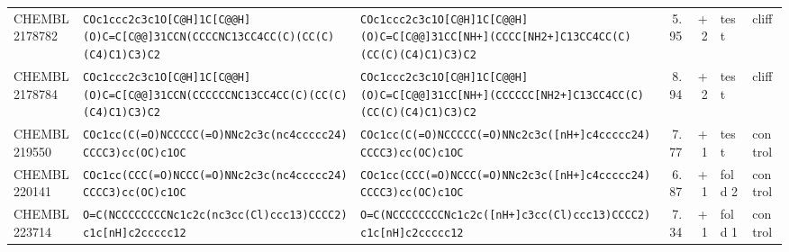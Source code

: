\begin{longtable}{l p{4.4cm} p{4.4cm} r r l l}
CHEMBL2178782 & \texttt{COc1ccc2c3c1O[C@H]\allowbreak{}1C[C@@H]\allowbreak{}(\allowbreak{}O)\allowbreak{}C=\allowbreak{}C[C@@]\allowbreak{}31CCN(\allowbreak{}CCCCNC13CC4CC(\allowbreak{}C)\allowbreak{}(\allowbreak{}CC(\allowbreak{}C)\allowbreak{}(\allowbreak{}C4)\allowbreak{}C1)\allowbreak{}C3)\allowbreak{}C2} & \texttt{COc1ccc2c3c1O[C@H]\allowbreak{}1C[C@@H]\allowbreak{}(\allowbreak{}O)\allowbreak{}C=\allowbreak{}C[C@@]\allowbreak{}31CC[NH+]\allowbreak{}(\allowbreak{}CCCC[NH2+]\allowbreak{}C13CC4CC(\allowbreak{}C)\allowbreak{}(\allowbreak{}CC(\allowbreak{}C)\allowbreak{}(\allowbreak{}C4)\allowbreak{}C1)\allowbreak{}C3)\allowbreak{}C2} & 5.95 & +2 & test & cliff \\
CHEMBL2178784 & \texttt{COc1ccc2c3c1O[C@H]\allowbreak{}1C[C@@H]\allowbreak{}(\allowbreak{}O)\allowbreak{}C=\allowbreak{}C[C@@]\allowbreak{}31CCN(\allowbreak{}CCCCCCNC13CC4CC(\allowbreak{}C)\allowbreak{}(\allowbreak{}CC(\allowbreak{}C)\allowbreak{}(\allowbreak{}C4)\allowbreak{}C1)\allowbreak{}C3)\allowbreak{}C2} & \texttt{COc1ccc2c3c1O[C@H]\allowbreak{}1C[C@@H]\allowbreak{}(\allowbreak{}O)\allowbreak{}C=\allowbreak{}C[C@@]\allowbreak{}31CC[NH+]\allowbreak{}(\allowbreak{}CCCCCC[NH2+]\allowbreak{}C13CC4CC(\allowbreak{}C)\allowbreak{}(\allowbreak{}CC(\allowbreak{}C)\allowbreak{}(\allowbreak{}C4)\allowbreak{}C1)\allowbreak{}C3)\allowbreak{}C2} & 8.94 & +2 & test & cliff \\
CHEMBL219550 & \texttt{COc1cc(\allowbreak{}C(\allowbreak{}=\allowbreak{}O)\allowbreak{}NCCCCC(\allowbreak{}=\allowbreak{}O)\allowbreak{}NNc2c3c(\allowbreak{}nc4ccccc24)\allowbreak{}CCCC3)\allowbreak{}cc(\allowbreak{}OC)\allowbreak{}c1OC} & \texttt{COc1cc(\allowbreak{}C(\allowbreak{}=\allowbreak{}O)\allowbreak{}NCCCCC(\allowbreak{}=\allowbreak{}O)\allowbreak{}NNc2c3c(\allowbreak{}[nH+]\allowbreak{}c4ccccc24)\allowbreak{}CCCC3)\allowbreak{}cc(\allowbreak{}OC)\allowbreak{}c1OC} & 7.77 & +1 & test & control \\
CHEMBL220141 & \texttt{COc1cc(\allowbreak{}CCC(\allowbreak{}=\allowbreak{}O)\allowbreak{}NCCC(\allowbreak{}=\allowbreak{}O)\allowbreak{}NNc2c3c(\allowbreak{}nc4ccccc24)\allowbreak{}CCCC3)\allowbreak{}cc(\allowbreak{}OC)\allowbreak{}c1OC} & \texttt{COc1cc(\allowbreak{}CCC(\allowbreak{}=\allowbreak{}O)\allowbreak{}NCCC(\allowbreak{}=\allowbreak{}O)\allowbreak{}NNc2c3c(\allowbreak{}[nH+]\allowbreak{}c4ccccc24)\allowbreak{}CCCC3)\allowbreak{}cc(\allowbreak{}OC)\allowbreak{}c1OC} & 6.87 & +1 & fold 2 & control \\
CHEMBL223714 & \texttt{O=\allowbreak{}C(\allowbreak{}NCCCCCCCCNc1c2c(\allowbreak{}nc3cc(\allowbreak{}Cl)\allowbreak{}ccc13)\allowbreak{}CCCC2)\allowbreak{}c1c[nH]\allowbreak{}c2ccccc12} & \texttt{O=\allowbreak{}C(\allowbreak{}NCCCCCCCCNc1c2c(\allowbreak{}[nH+]\allowbreak{}c3cc(\allowbreak{}Cl)\allowbreak{}ccc13)\allowbreak{}CCCC2)\allowbreak{}c1c[nH]\allowbreak{}c2ccccc12} & 7.34 & +1 & fold 1 & control \\

\end{longtable}
